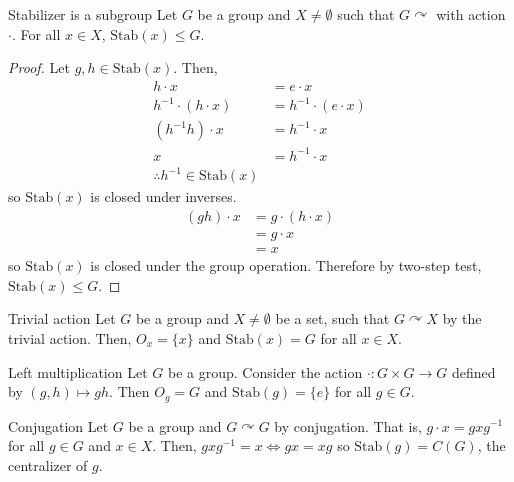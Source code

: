 \documentclass[12pt]{article}
\newcommand{\inv}{^{-1}}
\newcommand{\Stab}{\text{Stab}}
\begin{document}
	\begin{myprop}{Stabilizer is a subgroup}{}
		Let $G$ be a group and $X\neq\emptyset$ such that $G\curvearrowright$ with action $\cdot$. For all $x\in X$, $\Stab(x)\leq G$.
		\begin{proof}
			Let $g, h\in\Stab(x)$. Then,
			\begin{align*}
				h\cdot x&=e\cdot x\\
				h\inv\cdot(h\cdot x)&=h\inv\cdot(e\cdot x)\\
				(h\inv h)\cdot x&=h\inv\cdot x\\
				x&=h\inv\cdot x\\
				\therefore h\inv\in\Stab(x)
			\end{align*}
			so $\Stab(x)$ is closed under inverses.
			\begin{align*}
				(gh)\cdot x&=g\cdot(h\cdot x)\\
				&=g\cdot x\\
				&=x
			\end{align*}
			so $\Stab(x)$ is closed under the group operation. Therefore by two-step test, $\Stab(x)\leq G$.
		\end{proof}
	\end{myprop}
	
	\begin{myex}{Trivial action}{}
		Let $G$ be a group and $X\neq\emptyset$ be a set, such that $G\curvearrowright X$ by the trivial action. Then, $O_x=\{x\}$ and $\Stab(x)=G$ for all $x\in X$.
	\end{myex}
	
	\begin{myex}{Left multiplication}{}
		Let $G$ be a group. Consider the action $\cdot:G\times G\to G$ defined by $(g, h)\mapsto gh$. Then $O_g=G$ and $\Stab(g)=\{e\}$ for all $g\in G$.
	\end{myex}
	
	\begin{myex}{Conjugation}{}
		Let $G$ be a group and $G\curvearrowright G$ by conjugation. That is, $g\cdot x=gxg\inv$ for all $g\in G$ and $x\in X$. Then, $gxg\inv=x\Longleftrightarrow gx=xg$ so $\Stab(g)=C(G)$, the centralizer of $g$.
	\end{myex}
	
\end{document}
